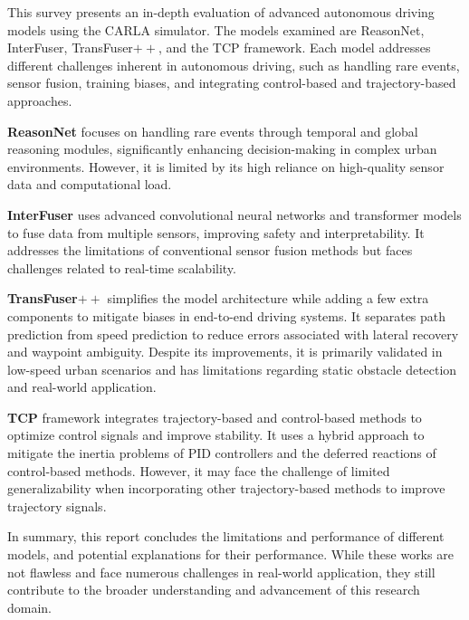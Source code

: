 This survey presents an in-depth evaluation of advanced autonomous driving models using the CARLA simulator. The models examined are ReasonNet, InterFuser, TransFuser$++$, and the TCP framework. Each model addresses different challenges inherent in autonomous driving, such as handling rare events, sensor fusion, training biases, and integrating control-based and trajectory-based approaches.

\textbf{ReasonNet} focuses on handling rare events through temporal and global reasoning modules, significantly enhancing decision-making in complex urban environments. However, it is limited by its high reliance on high-quality sensor data and computational load.

\textbf{InterFuser} uses advanced convolutional neural networks and transformer models to fuse data from multiple sensors, improving safety and interpretability. It addresses the limitations of conventional sensor fusion methods but faces challenges related to real-time scalability.

\textbf{TransFuser$++$} simplifies the model architecture while adding a few extra components to mitigate biases in end-to-end driving systems. It separates path prediction from speed prediction to reduce errors associated with lateral recovery and waypoint ambiguity. Despite its improvements, it is primarily validated in low-speed urban scenarios and has limitations regarding static obstacle detection and real-world application.

\textbf{TCP} framework integrates trajectory-based and control-based methods to optimize control signals and improve stability. It uses a hybrid approach to mitigate the inertia problems of PID controllers and the deferred reactions of control-based methods. However, it may face the challenge of limited generalizability when incorporating other trajectory-based methods to improve trajectory signals.

In summary, this report concludes the limitations and performance of different models, and potential explanations for their performance. While these works are not flawless and face numerous challenges in real-world application, they still contribute to the broader understanding and advancement of this research domain.